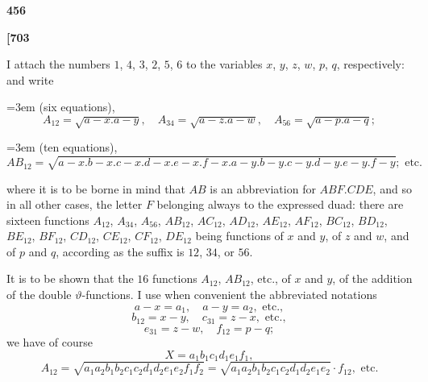 \documentclass[11pt,a4paper]{book}
\begin{document}
\vspace{1em}

\begin{center}
\textbf{456}
\end{center}

\vspace{0.5em}

\noindent\textbf{[703}

\vspace{0.5em}

I attach the numbers $1$, $4$, $3$, $2$, $5$, $6$ to the variables $x$, $y$, $z$, $w$, $p$, $q$, respectively: and write

\noindent\hangindent=3em (six equations),
\[
A_{12} = \sqrt{a - x . a - y},\quad A_{34} = \sqrt{a - z . a - w},\quad A_{56} = \sqrt{a - p . a - q};
\]

\noindent\hangindent=3em (ten equations),
\[
AB_{12} = \sqrt{a - x . b - x . c - x . d - x . e - x . f - x . a - y . b - y . c - y . d - y . e - y . f - y}; \text{ etc.}
\]

where it is to be borne in mind that $AB$ is an abbreviation for $ABF.CDE$, and so in all other cases, the letter $F$ belonging always to the expressed duad: there are sixteen functions $A_{12}$, $A_{34}$, $A_{56}$, $AB_{12}$, $AC_{12}$, $AD_{12}$, $AE_{12}$, $AF_{12}$, $BC_{12}$, $BD_{12}$, $BE_{12}$, $BF_{12}$, $CD_{12}$, $CE_{12}$, $CF_{12}$, $DE_{12}$ being functions of $x$ and $y$, of $z$ and $w$, and of $p$ and $q$, according as the suffix is $12$, $34$, or $56$.

It is to be shown that the $16$ functions $A_{12}$, $AB_{12}$, etc., of $x$ and $y$, of the addition of the double $\vartheta$-functions. I use when convenient the abbreviated notations
\[
a - x = a_1,\quad a - y = a_2, \text{ etc.},
\]
\[
b_{12} = x - y,\quad c_{31} = z - x, \text{ etc.},
\]
\[
e_{31} = z - w,\quad f_{12} = p - q;
\]
we have of course
\[
X = a_1 b_1 c_1 d_1 e_1 f_1,
\]
\[
A_{12} = \sqrt{a_1 a_2 b_1 b_2 c_1 c_2 d_1 d_2 e_1 e_2 f_1 f_2} = \sqrt{a_1 a_2 b_1 b_2 c_1 c_2 d_1 d_2 e_1 e_2} \cdot f_{12}, \text{ etc.}
\]

\vspace{1em}
\end{document}
